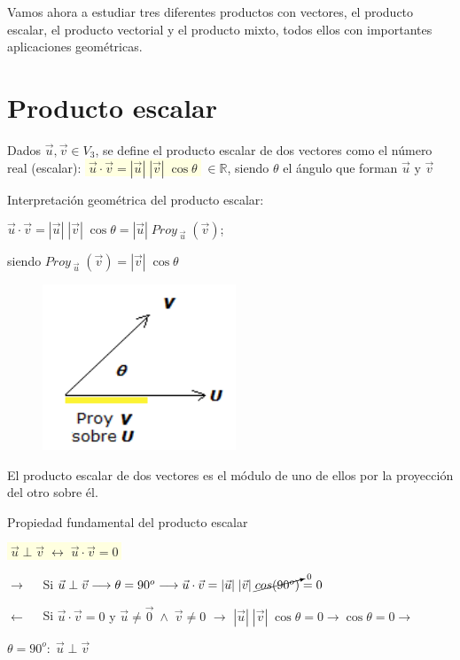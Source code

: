 Vamos ahora a estudiar tres diferentes productos con vectores, el producto escalar, el producto vectorial y el producto mixto, todos ellos con importantes aplicaciones geométricas.
\section{Producto escalar}\label{prodesc}

\begin{defi}
Dados $\vec u, \vec v \in V_3$, se define el producto escalar de dos vectores como el número real (escalar): \colorbox{LightYellow}{$\boxed{\; \vec u \cdot \vec v=|\vec u|\;|\vec v|\; \cos \theta\; }$}$\; \in \mathbb R$, siendo $\theta$ el ángulo que forman $\vec u \text{ y } \vec v$	
\end{defi}

\begin{multicols}{2}
\noindent Interpretación geométrica del producto escalar:

\noindent $\vec u \cdot \vec v=|\vec u|\;|\vec v|\; \cos \theta=|\vec u|\; Proy_{\;\vec u}\;(\vec v)$; 

\noindent siendo $Proy_{\; \vec u}\;(\vec v)=|\vec v|\; \cos \theta$

\begin{figure}[H]
	\centering
	\includegraphics[width=.3\textwidth]{imagenes/imagenes09/T09IM16.png}
\end{figure}
\end{multicols}

\vspace{-5mm} El producto escalar de dos vectores es el módulo de uno de ellos por la proyección del otro sobre él.

\begin{prop}{Propiedad fundamental del producto escalar}

\vspace{3mm} \centerline{\colorbox{LightYellow}{$\; \vec u \; \bot \; \vec v \;  \longleftrightarrow \; \vec u \cdot \vec v = 0\; $}}	
\end{prop}
\justify
\vspace{-3mm} \begin{proofw}
$\boxed{\rightarrow} \quad$	Si $\vec u \; \bot \; \vec v  \longrightarrow \theta=90^o \longrightarrow \vec u \cdot \vec v=|\vec u|\;|\vec v|\; \cancelto{0}{cos (90^o)}=0$

\noindent $\boxed{\leftarrow} \quad$	 Si $\vec u \cdot \vec v = 0$  \scriptsize{y $\vec u\neq \vec 0\; \wedge \; \vec v \neq 0$}  \normalsize{$\to$}  $|\vec u|\;|\vec v|\; \cos \theta=0 \to \cos \theta=0 \longrightarrow $

\noindent $\theta =90^o:\; \vec u \; \bot \; \vec v$
\end{proofw}

